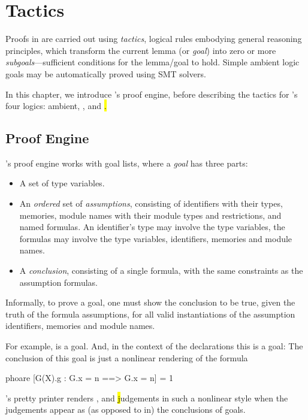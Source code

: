 \chapter{Tactics}
\label{Tactics}

Proofs in \EasyCrypt are carried out using \emph{tactics}, logical
rules embodying general reasoning principles, which transform the
current lemma (or \emph{goal}) into zero or more
\emph{subgoals}---sufficient conditions for the lemma/goal to
hold. Simple ambient logic goals may be automatically proved using SMT
solvers.

In this chapter, we introduce \EasyCrypt's proof engine, before
describing the tactics for \EasyCrypt's four logics: ambient, \prhl,
\phl and \hl.

\section{Proof Engine}

\EasyCrypt's proof engine works with goal lists, where a \emph{goal}
has three parts:
\begin{itemize}
\item A set of type variables.

\item An \emph{ordered} set of \emph{assumptions}, consisting of
  identifiers with their types, memories, module names with their
  module types and restrictions, and named formulas. An identifier's
  type may involve the type variables, the formulas may involve the
  type variables, identifiers, memories and module names.

\item A \emph{conclusion}, consisting of a single formula, with
  the same constraints as the assumption formulas.
\end{itemize}
Informally, to prove a goal, one must show the conclusion to be true,
given the truth of the formula assumptions, for all valid instantiations
of the assumption identifiers, memories and module names.

For example,
is a goal.
And, in the context of the declarations
this is a goal:
The conclusion of this goal is just a nonlinear rendering of the formula
\begin{easycrypt}{}{}
phoare [G(X).g : G.x = n ==> G.x = n] = 1%
\end{easycrypt}
\EasyCrypt's pretty printer renders \prhl, \phl and \hl judgements
in such a nonlinear style when the judgements appear as
(as opposed to in) the conclusions of goals.

